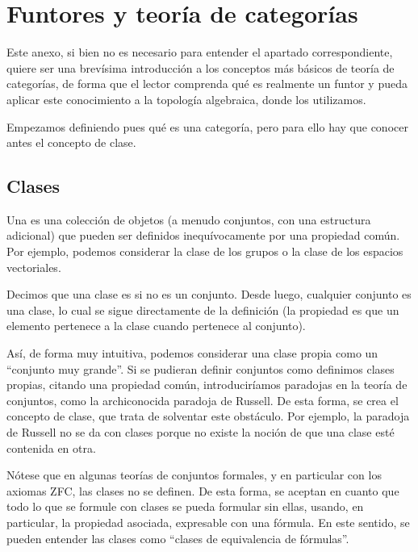 \chapter{Funtores y teoría de categorías}
\label{funt}

Este anexo, si bien no es necesario para entender el apartado correspondiente, quiere ser una brevísima introducción a los conceptos más básicos de teoría de categorías, de forma que el lector comprenda qué es realmente un funtor y pueda aplicar este conocimiento a la topología algebraica, donde los utilizamos. 

Empezamos definiendo pues qué es una categoría, pero para ello hay que conocer antes el concepto de clase.

\section{Clases}

\begin{defi}[Clase]
Una  es una colección de objetos (a menudo conjuntos, con una estructura adicional) que pueden ser definidos inequívocamente por una propiedad común. Por ejemplo, podemos considerar la clase de los grupos o la clase de los espacios vectoriales.
\end{defi}

\begin{obs}
Decimos que una clase es  si no es un conjunto. Desde luego, cualquier conjunto es una clase, lo cual se sigue directamente de la definición (la propiedad es que un elemento pertenece a la clase cuando pertenece al conjunto).

Así, de forma muy intuitiva, podemos considerar una clase propia como un ``conjunto muy grande''. Si se pudieran definir conjuntos como definimos clases propias, citando una propiedad común, introduciríamos paradojas en la teoría de conjuntos, como la archiconocida paradoja de Russell. De esta forma, se crea el concepto de clase, que trata de solventar este obstáculo. Por ejemplo, la paradoja de Russell no se da con clases porque no existe la noción de que una clase esté contenida en otra.

Nótese que en algunas teorías de conjuntos formales, y en particular con los axiomas ZFC, las clases no se definen. De esta forma, se aceptan en cuanto que todo lo que se formule con clases se pueda formular sin ellas, usando, en particular, la propiedad asociada, expresable con una fórmula. En este sentido, se pueden entender las clases como ``clases de equivalencia de fórmulas''.
\end{obs}

